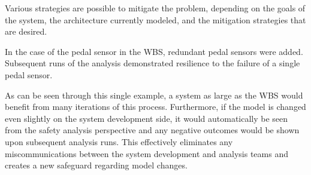 Various strategies are possible to mitigate the problem, depending on the goals of the system, the architecture currently modeled, and the mitigation strategies that are desired.

In the case of the pedal sensor in the WBS, %
redundant  pedal sensors were added. 
Subsequent runs of the analysis demonstrated resilience to the failure of a single pedal sensor. 

As can be seen through this single example, a system as large as the WBS would benefit from many iterations of this process. Furthermore, if the model is changed even slightly on the system development side, it would automatically be seen from the safety analysis perspective and any negative outcomes would be shown upon subsequent analysis runs. This effectively eliminates any miscommunications between the system development and analysis teams and creates a new safeguard regarding model changes. 

